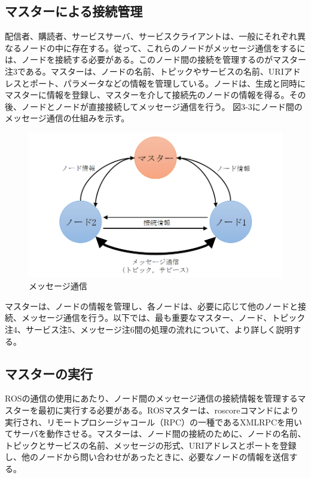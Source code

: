 \subsection{マスターによる接続管理}
配信者、購読者、サービスサーバ、サービスクライアントは、一般にそれぞれ異なるノードの中に存在する。従って、これらのノードがメッセージ通信をするには、ノードを接続する必要がある。このノード間の接続を管理するのがマスター注3である。マスターは、ノードの名前、トピックやサービスの名前、URIアドレスとポート、パラメータなどの情報を管理している。ノードは、生成と同時にマスターに情報を登録し、マスターを介して接続先のノードの情報を得る。その後、ノードとノードが直接接続してメッセージ通信を行う。
図3-3にノード間のメッセージ通信の仕組みを示す。

\begin{figure}[h]
  \centering
  \includegraphics[width=\columnwidth]{pictures/chapter3/pic_03_03.png}
  \caption{メッセージ通信}
\end{figure}

マスターは、ノードの情報を管理し、各ノードは、必要に応じて他のノードと接続、メッセージ通信を行う。以下では、最も重要なマスター、ノード、トピック注4、サービス注5、メッセージ注6間の処理の流れについて、より詳しく説明する。

\subsection{マスターの実行}

ROSの通信の使用にあたり、ノード間のメッセージ通信の接続情報を管理するマスターを最初に実行する必要がある。ROSマスターは、roscoreコマンドにより実行され、リモートプロシージャコール（RPC）の一種であるXMLRPCを用いてサーバを動作させる。マスターは、ノード間の接続のために、ノードの名前、トピックとサービスの名前、メッセージの形式、URIアドレスとポートを登録し、他のノードから問い合わせがあったときに、必要なノードの情報を送信する。

